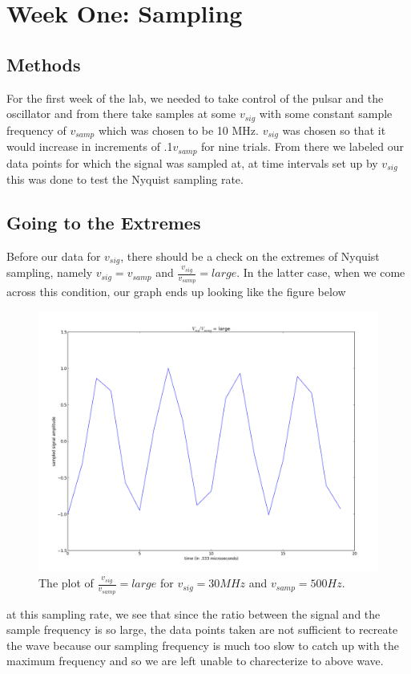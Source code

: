 \documentclass[12 pt]{article}
\begin{document}
\section{Week  One: Sampling}

\subsection{Methods}
For the first week of the lab,  we needed to take control of the pulsar
and the oscillator and from there take samples at some $v_{sig}$ with
some constant sample frequency of $v_{samp}$ which was chosen to be 10
MHz. $v_{sig}$ was chosen so that it would increase in increments of
.1$v_{samp}$ for nine trials. From there we labeled our data points for
which the signal was sampled at, at time intervals set up by $v_{sig}$
this was done to test the Nyquist sampling rate. 

\subsection{Going to the Extremes}
Before our data for $v_{sig}$, there should be a check on the extremes
of Nyquist sampling, namely $v_{sig} = v_{samp}$ and
$\frac{v_{sig}}{v_{samp}} = large$. In the latter case, when we come
across this condition, our graph ends up looking like the figure below

\begin{figure}[H]
\center
\includegraphics[scale=0.4]{vsigovervsamplarge.png}
\caption{The plot of $\frac{v_{sig}}{v_{samp}} = large$ for $v_{sig} =
  30 MHz$ and $v_{samp} = 500 Hz$.}
\label{signal equals the sampling rate}
\end{figure}
at this sampling rate, we see that since the ratio between the signal
and the sample frequency is so large, the data points taken are not
sufficient to recreate the wave because our sampling frequency is much
too slow to catch up with the maximum frequency and so we are left
unable to charecterize to above wave. 
\end{document}
